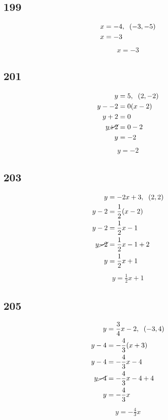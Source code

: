 \documentclass{article}
\begin{document}
    \subsection*{199}
    \begin{align*}
        x &= -4, \hspace{.2cm}(-3, -5)\\
        x &= -3
    \end{align*}
    \begin{align*}
        \boxed{x = -3}
    \end{align*}

    \subsection*{201}
    \begin{align*}
        y &= 5, \hspace{.2cm}(2, -2)\\
        y - -2 &= 0(x - 2) \\
        y + 2 &= 0 \\
        y \cancel{+ 2} &= 0 - 2\\
        y &= -2
    \end{align*}
    \begin{align*}
        \boxed{y = -2}
    \end{align*}

    \subsection*{203}
    \begin{align*}
        y &= -2x + 3, \hspace{.2cm}(2, 2)\\
        y - 2 &= \frac{1}{2}(x - 2) \\
        y - 2 &= \frac{1}{2}x - 1 \\
        y \cancel{- 2} &= \frac{1}{2}x - 1 + 2\\
        y &= \frac{1}{2}x +1
    \end{align*}
    \begin{align*}
        \boxed{y = \frac{1}{2}x +1}
    \end{align*}

    \subsection*{205}
    \begin{align*}
        y &= \frac{3}{4}x - 2, \hspace{.2cm} (-3, 4)\\
        y - 4 &= -\frac{4}{3}(x + 3) \\
        y - 4 &= -\frac{4}{3}x - 4 \\
        y \cancel{- 4} &= -\frac{4}{3}x -4 +4\\
        y &= -\frac{4}{3}x
    \end{align*}
    \begin{align*}
        \boxed{y = -\frac{4}{3}x}
    \end{align*}
\end{document}
